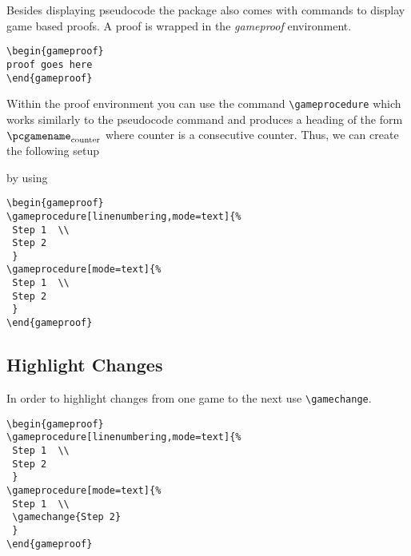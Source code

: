 \documentclass[a4paper]{report}
\begin{document}
Besides displaying pseudocode the package also comes with commands to display game based proofs. A proof
is wrapped in the \emph{gameproof} environment.
\begin{lstlisting}
\begin{gameproof}
proof goes here
\end{gameproof}
\end{lstlisting}
Within the proof environment you can use the command \lstinline$\gameprocedure$ which works similarly to the pseudocode
command and produces a heading of the form $\pcgamename_{\text{counter}}$ where counter is a consecutive counter.
Thus, we can create the following setup
\begin{center}
\begin{gameproof}
\end{gameproof}
\end{center}
by using
\begin{lstlisting}
\begin{gameproof}
\gameprocedure[linenumbering,mode=text]{%
 Step 1  \\
 Step 2
 }
\gameprocedure[mode=text]{%
 Step 1  \\
 Step 2
 }
\end{gameproof}
\end{lstlisting}



\subsection{Highlight Changes}
In order to highlight changes from one game to the next use \lstinline$\gamechange$.
\begin{center}
\begin{gameproof}
\end{gameproof}
\end{center}
\begin{lstlisting}
\begin{gameproof}
\gameprocedure[linenumbering,mode=text]{%
 Step 1  \\
 Step 2
 }
\gameprocedure[mode=text]{%
 Step 1  \\
 \gamechange{Step 2}
 }
\end{gameproof}
\end{lstlisting}
\end{document}
